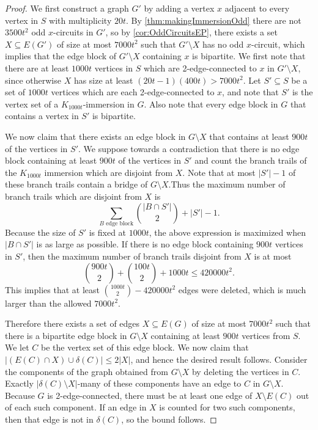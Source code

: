 \documentclass{article}
\theoremstyle{definition}
\begin{document}
\begin{proof}
    We first construct a graph $G'$ by adding a vertex $x$ adjacent to every vertex in $S$ with multiplicity $20t$. By \cref{thm:makingImmersionOdd} there are not $3500t^2$ odd $x$-circuits in $G'$, so by \cref{cor:OddCircuitsEP}, there exists a set $X \subseteq E(G')$ of size at most $7000t^2$ such that $G' \setminus X$ has no odd $x$-circuit, which implies that the edge block of $G' \setminus X$ containing $x$ is bipartite. We first note that there are at least $1000t$ vertices in $S$ which are 2-edge-connected to $x$ in $G' \setminus X$, since otherwise $X$ has size at least $(20t-1)(400t) > 7000t^2$. Let $S' \subseteq S$ be a set of $1000t$ vertices which are each 2-edge-connected to $x$, and note that $S'$ is the vertex set of a $K_{1000t}$-immersion in $G$. Also note that every edge block in $G$ that contains a vertex in $S'$ is bipartite.
    
    We now claim that there exists an edge block in $G \setminus X$ that contains at least $900t$ of the vertices in $S'$. We suppose towards a contradiction that there is no edge block containing at least $900t$ of the vertices in $S'$ and count the branch trails of the $K_{1000t}$ immersion which are disjoint from $X$. Note that at most $|S'|-1$ of these branch trails contain a bridge of $G\setminus X$.Thus the maximum number of branch trails which are disjoint from $X$ is
    $$\sum_{B\text{ edge block}} \binom{|B \cap S'|}{2} + |S'| - 1.$$
    Because the size of $S'$ is fixed at $1000t$, the above expression is maximized when $|B \cap S'|$ is as large as possible. If there is no edge block containing $900t$ vertices in $S'$, then the maximum number of branch trails disjoint from $X$ is at most
    $$\binom{900t}{2} + \binom{100t}{2} + 1000t \leq 420000t^2.$$
    This implies that at least $\binom{1000t}{2} - 420000t^2$ edges were deleted, which is much larger than the allowed $7000t^2$.

    Therefore there exists a set of edges $X \subseteq E(G)$ of size at most $7000t^2$ such that there is a bipartite edge block in $G \setminus X$ containing at least $900t$ vertices from $S$. We let $C$ be the vertex set of this edge block. We now claim that $|(E(C) \cap X) \cup \delta(C)| \leq 2|X|$, and hence the desired result follows. Consider the components of the graph obtained from $G\setminus X$ by deleting the vertices in $C$. Exactly $|\delta(C)\setminus X|$-many of these components have an edge to $C$ in $G\setminus X$. Because $G$ is 2-edge-connected, there must be at least one edge of $X \setminus E(C)$ out of each such component. If an edge in $X$ is counted for two such components, then that edge is not in $\delta(C)$, so the bound follows.
\end{proof}
\end{document}
